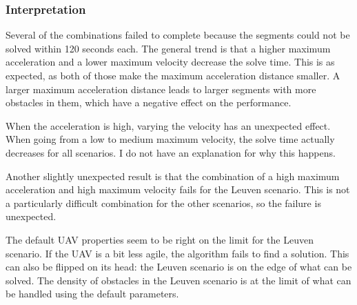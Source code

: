 \subsubsection{Interpretation}
Several of the combinations failed to complete because the segments could not be solved within 120 seconds each. The general trend is that a higher maximum acceleration and a lower maximum velocity decrease the solve time. This is as expected, as both of those make the maximum acceleration distance smaller. A larger maximum acceleration distance leads to larger segments with more obstacles in them, which have a negative effect on the performance. 
\par
When the acceleration is high, varying the velocity has an unexpected effect. When going from a low to medium maximum velocity, the solve time actually decreases for all scenarios. I do not have an explanation for why this happens.
\par
Another slightly unexpected result is that the combination of a high maximum acceleration and high maximum velocity fails for the Leuven scenario. This is not a particularly difficult combination for the other scenarios, so the failure is unexpected.
\par
The default UAV properties seem to be right on the limit for the Leuven scenario. If the UAV is a bit less agile, the algorithm fails to find a solution. This can also be flipped on its head: the Leuven scenario is on the edge of what can be solved. The density of obstacles in the Leuven scenario is at the limit of what can be handled using the default parameters.
